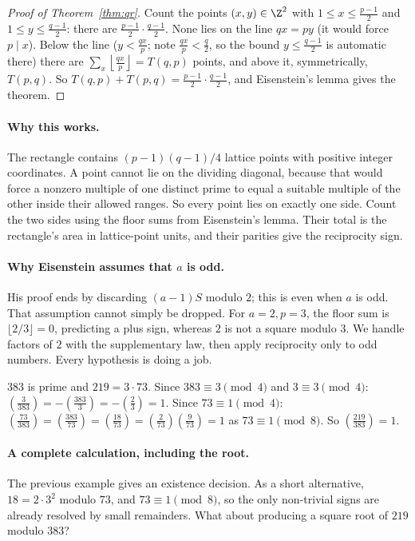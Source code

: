 \begin{proof}[Proof of Theorem~\ref{thm:qr}]
Count the points $(x,y)\in\Z^2$ with $1\le x\le\frac{p-1}2$ and $1\le y\le\frac{q-1}2$: there are $\frac{p-1}2\cdot\frac{q-1}2$. None lies on the line $qx=py$ (it would force $p\mid x$). Below the line ($y<\frac{qx}p$; note $\frac{qx}p<\frac q2$, so the bound $y\le\frac{q-1}2$ is automatic there) there are $\sum_x\left\lfloor\frac{qx}p\right\rfloor=T(q,p)$ points, and above it, symmetrically, $T(p,q)$. So $T(q,p)+T(p,q)=\frac{p-1}2\cdot\frac{q-1}2$, and Eisenstein's lemma gives the theorem.
\end{proof}

\paragraph{Why this works.}
The rectangle contains $(p-1)(q-1)/4$ lattice points with positive integer coordinates. A point cannot lie on the dividing diagonal, because that would force a nonzero multiple of one distinct prime to equal a suitable multiple of the other inside their allowed ranges. So every point lies on exactly one side. Count the two sides using the floor sums from Eisenstein's lemma. Their total is the rectangle's area in lattice-point units, and their parities give the reciprocity sign.

\paragraph{Why Eisenstein assumes that $a$ is odd.}
His proof ends by discarding $(a-1)S$ modulo $2$; this is even when $a$ is
odd. That assumption cannot simply be dropped. For $a=2,p=3$, the floor sum
is $\lfloor2/3\rfloor=0$, predicting a plus sign, whereas $2$ is not a square
modulo $3$. We handle factors of $2$ with the supplementary law, then apply
reciprocity only to odd numbers. Every hypothesis is doing a job.

\begin{example}
$383$ is prime and $219=3\cdot73$. Since $383\equiv3\pmod4$ and $3\equiv3\pmod4$: $\left(\frac3{383}\right)=-\left(\frac{383}3\right)=-\left(\frac23\right)=1$. Since $73\equiv1\pmod4$: $\left(\frac{73}{383}\right)=\left(\frac{383}{73}\right)=\left(\frac{18}{73}\right)=\left(\frac2{73}\right)\left(\frac9{73}\right)=1$ as $73\equiv1\pmod8$. So $\left(\frac{219}{383}\right)=1$.
\end{example}

\paragraph{A complete calculation, including the root.}
The previous example gives an existence decision. As a short alternative,
$18=2\cdot3^2$ modulo $73$, and $73\equiv1\pmod8$, so the only non-trivial
signs are already resolved by small remainders. What about producing a square
root of $219$ modulo $383$?

